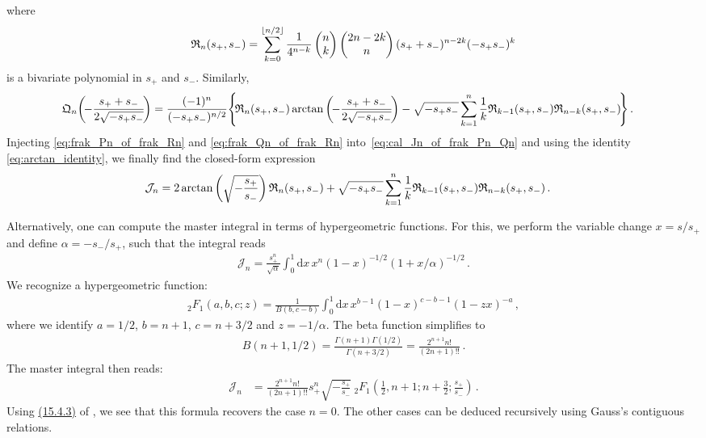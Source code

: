 \documentclass[prd,superscriptaddress,preprintnumbers,tightenlines,nofootinbib, eqsecnum]{revtex4-2}
\renewcommand{\dd}{\mathrm{d}}
\begin{document}
where   
\begin{align}\label{eq:frak_Rn_def}
    \frak{R}_n(s_+,s_-) =  \sum_{k=0}^{\lfloor n/2 \rfloor} \frac{1}{4^{n-k}}\begin{pmatrix}
        n\\k
    \end{pmatrix} \begin{pmatrix}
        2n-2k\\n
    \end{pmatrix}  (s_+ + s_-)^{n-2k}(-s_+ s_-)^{k}
\end{align}
is a bivariate polynomial in $s_+$ and $s_-$. Similarly,
\begin{align}\label{eq:frak_Qn_of_frak_Rn}
    \frak{Q}_n\!\left(\!- \frac{s_+ + s_-}{2\sqrt{-s_+ s_-}}\!\right) &= \frac{(-1)^n}{(-s_+ s_-)^{n/2}} \Bigg\{ \! \frak{R}_n(s_+,s_-)\arctan\left(\!- \frac{s_+ + s_-}{2\sqrt{-s_+ s_-}}\!\right) - 
    \sqrt{-s_+ s_-}  \sum_{k=1}^{n} \frac{1}{k}    \frak{R}_{k-1}(s_+,s_-)   \frak{R}_{n-k}(s_+,s_-)\! \Bigg\}\,.
\end{align}
Injecting \eqref{eq:frak_Pn_of_frak_Rn} and \eqref{eq:frak_Qn_of_frak_Rn}  into~\eqref{eq:cal_Jn_of_frak_Pn_Qn} and using the identity \eqref{eq:arctan_identity}, we finally find the closed-form expression
\begin{align}
    \mathcal{J}_n &=      2 \arctan\left(\sqrt{-\frac{s_+}{s_-}}\right)  \frak{R}_n(s_+,s_-)
    + \sqrt{-s_+ s_-}  \sum_{k=1}^{n} \frac{1}{k}    \frak{R}_{k-1}(s_+,s_-)   \frak{R}_{n-k}(s_+,s_-) \,.
\end{align}

 

Alternatively, one can compute the master integral in terms of hypergeometric functions. For this, we perform the variable change $x=s/s_+$ and define $\alpha=-s_-/s_+$, such that the integral reads
\begin{align}
    \mathcal{J}_n=\frac{s_+^{n}}{\sqrt{\alpha}}\int_0^1 \dd x \,x^n(1-x)^{-1/2}(1+x/\alpha)^{-1/2} \,.
\end{align}
We recognize a hypergeometric function:
\begin{align}
    {}_2F_1(a,b,c;z)= \frac{1}{B(b,c-b)}\int_0^1 \dd x \,x^{b-1}(1-x)^{c-b-1}(1-z x)^{-a} \,,
\end{align}
where we identify $a=1/2$, $b=n+1$, $c=n+3/2$ and $z=-1/\alpha$. The beta function simplifies to 
\begin{align}
    B(n+1,1/2) = \frac{\Gamma(n+1)\Gamma(1/2)}{\Gamma(n+3/2)} = \frac{2^{n+1}n!}{(2n+1)!!} \,.
\end{align}
%
The master integral then reads:
\begin{align}
    \mathcal{J}_n &= \frac{2^{n+1}n!}{(2n+1)!!} s_+^n\sqrt{-\frac{s_+}{s_-}} \ {}_2F_1 \!\left(\frac{1}{2},n+1;n+\frac{3}{2}; \frac{s_+}{s_-}\right) \,.
\end{align}
Using \href{https://dlmf.nist.gov/15.4#E3}{(15.4.3)} of \cite{NIST:DLMF}, we see that this formula recovers the case $n=0$. The other cases can be deduced recursively using Gauss's contiguous relations.
\end{document}
